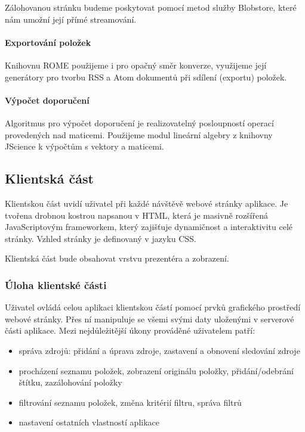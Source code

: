 Zálohovanou stránku budeme poskytovat pomocí metod služby Blobstore, které nám umožní její přímé streamování.

\paragraph{Exportování položek}
Knihovnu ROME použijeme i pro opačný směr konverze, využijeme její generátory pro tvorbu RSS a Atom dokumentů při sdílení (exportu) položek.

\paragraph{Výpočet doporučení}
Algoritmus pro výpočet doporučení je realizovatelný posloupností operací provedených nad maticemi.
Použijeme modul lineární algebry z knihovny JScience k výpočtům s vektory a maticemi.

\subsection{Klientská část}

Klientskou část uvidí uživatel při každé návštěvě webové stránky aplikace.
Je tvořena drobnou kostrou napsanou v HTML, která je masivně rozšířená JavaScriptovým frameworkem, který zajišťuje dynamičnost a interaktivitu celé stránky.
Vzhled stránky je definovaný v jazyku CSS.

Klientská část bude obsahovat vrstvu prezentéra a zobrazení.

\subsubsection{Úloha klientské části}

Uživatel ovládá celou aplikaci klientskou částí pomocí prvků grafického prostředí webové stránky.
Přes ní manipuluje se všemi svými daty uloženými v serverové části aplikace.
Mezi nejdůležitější úkony prováděné uživatelem patří:
\begin{itemize}
	\item správa zdrojů: přidání a úprava zdroje, zastavení a obnovení sledování zdroje
	\item procházení seznamu položek, zobrazení originálu položky, přidání/odebrání štítku, zazálohování položky
	\item filtrování seznamu položek, změna kritérií filtru, správa filtrů
	\item nastavení ostatních vlastností aplikace
\end{itemize}

